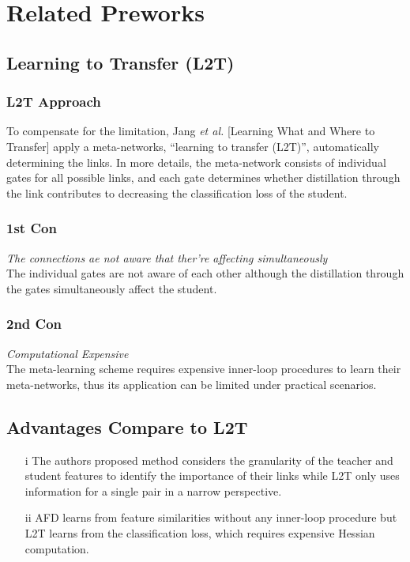 \documentclass{article}
\begin{document}
	\section{Related Preworks}
	\subsection{Learning to Transfer (L2T)}
	\subsubsection{L2T Approach}
	To compensate for the limitation, Jang \textit{et al.} [Learning What and Where to Transfer] apply a meta-networks, ``learning to transfer (L2T)'', automatically determining the links.
	In more details, the meta-network consists of individual gates for all possible links, and each gate determines whether distillation through the link contributes to decreasing the classification loss of the student.
	\subsubsection{1st Con}
	\textit{The connections ae not aware that ther're affecting simultaneously}\\
	The individual gates are not aware of each other although the distillation through the gates simultaneously affect the student. 
	\subsubsection{2nd Con}
	\textit{Computational Expensive}\\
	The meta-learning scheme requires expensive inner-loop procedures to learn their meta-networks, thus its application can be limited under practical scenarios.
	\subsection{Advantages Compare to L2T}
	\begin{itemize}
		\item[i] The authors proposed method considers the granularity of the teacher and student features to identify the importance of their links while L2T only uses information for a single pair in a narrow perspective.
		\item[ii] AFD learns from feature similarities without any inner-loop procedure but L2T learns from the classification loss, which requires expensive Hessian computation.
	\end{itemize}
\end{document}
